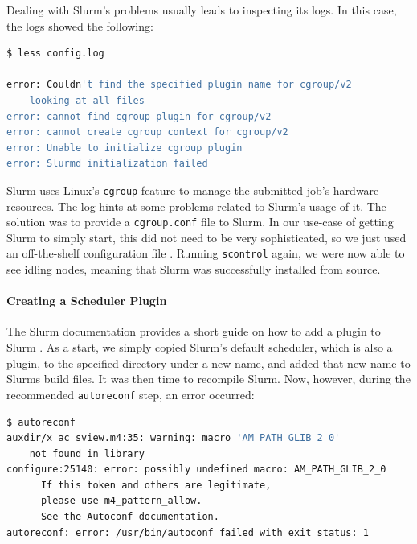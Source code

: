 Dealing with Slurm's problems usually leads to inspecting its logs. 
In this case, the logs showed the following:

\begin{minipage}{\linewidth}
\begin{lstlisting}[language=bash, frame=single, numbers=none, caption={Slurm's cgroup configuration is missing according to the logs}, basicstyle=\ttfamily]
$ less config.log

error: Couldn't find the specified plugin name for cgroup/v2
    looking at all files
error: cannot find cgroup plugin for cgroup/v2
error: cannot create cgroup context for cgroup/v2
error: Unable to initialize cgroup plugin
error: Slurmd initialization failed
\end{lstlisting}
\end{minipage}

Slurm uses Linux's \verb|cgroup| feature to manage the submitted job's hardware resources. The log hints at some problems related to Slurm's usage of it.
The solution was to provide a \verb|cgroup.conf| file to Slurm. In our use-case of getting Slurm to simply start, this did not need to be very sophisticated, so we just used an off-the-shelf configuration file .
Running \verb|scontrol| again, we were now able to see idling nodes, meaning that Slurm was successfully installed from source.

\paragraph{Creating a Scheduler Plugin}

The Slurm documentation provides a short guide on how to add a plugin to Slurm .
As a start, we simply copied Slurm's default scheduler, which is also a plugin, to the specified directory under a new name, and added that new name to Slurms build files. 
It was then time to recompile Slurm. 
Now, however, during the recommended \verb|autoreconf| step, an error occurred:

\begin{minipage}{\linewidth}
\begin{lstlisting}[language=bash, frame=single, numbers=none, caption={Plugin recompilation errors}, basicstyle=\ttfamily]
$ autoreconf
auxdir/x_ac_sview.m4:35: warning: macro 'AM_PATH_GLIB_2_0' 
    not found in library
configure:25140: error: possibly undefined macro: AM_PATH_GLIB_2_0
      If this token and others are legitimate, 
      please use m4_pattern_allow.
      See the Autoconf documentation.
autoreconf: error: /usr/bin/autoconf failed with exit status: 1
\end{lstlisting}
\end{minipage}

